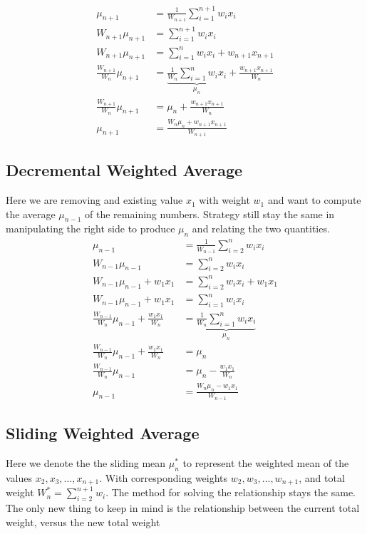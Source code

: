 \documentclass[english,12pt]{article}
\theoremstyle{plain}
\theoremstyle{definition}
\theoremstyle{definition} %
\begin{document}
\begin{align*}
\mu_{n+1} &= \frac{1}{W_{n+1}}\sum_{i=1}^{n+1} w_ix_i\\
W_{n+1}\mu_{n+1} &= \sum_{i=1}^{n+1} w_ix_i\\
W_{n+1}\mu_{n+1} &= \sum_{i=1}^{n} w_ix_i + w_{n+1}x_{n+1}\\
\frac{W_{n+1}}{W_n}\mu_{n+1} &= \underbrace{\frac{1}{W_n}\sum_{i=1}^{n} w_ix_i}_{\mu_n} + \frac{w_{n+1}x_{n+1}}{W_n}\\
\frac{W_{n+1}}{W_n}\mu_{n+1} &= \mu_n + \frac{w_{n+1}x_{n+1}}{W_n}\\
\mu_{n+1} &= \frac{W_n\mu_n + w_{n+1}x_{n+1}}{W_{n+1}}
\end{align*}

\subsection{Decremental Weighted Average}
Here we are removing and existing value $x_1$ with weight $w_1$ and want to compute the average $\mu_{n-1}$ of the remaining numbers.  Strategy still stay the same in manipulating the right side to produce $\mu_{n}$ and relating the two quantities.
\begin{align*}
\mu_{n-1} &= \frac{1}{W_{n-1}}\sum_{i=2}^nw_ix_i\\
W_{n-1}\mu_{n-1} &= \sum_{i=2}^nw_ix_i\\
W_{n-1}\mu_{n-1} + w_1x_1 &= \sum_{i=2}^nw_ix_i + w_1x_1\\
W_{n-1}\mu_{n-1} + w_1x_1 &= \sum_{i=1}^nw_ix_i\\
\frac{W_{n-1}}{W_n}\mu_{n-1} + \frac{w_1x_1}{W_n} &= \underbrace{\frac{1}{W_n}\sum_{i=1}^nw_ix_i}_{\mu_n}\\
\frac{W_{n-1}}{W_n}\mu_{n-1} + \frac{w_1x_1}{W_n} &= \mu_n\\
\frac{W_{n-1}}{W_n}\mu_{n-1}  &= \mu_n - \frac{w_1x_1}{W_n}\\
\mu_{n-1} &= \frac{W_n\mu_n - w_1x_1}{W_{n-1}}
\end{align*}

\subsection{Sliding Weighted Average}
Here we denote the the sliding mean $\mu_n^\ast$ to represent the weighted mean of the values $x_2,x_3,\ldots, x_{n+1}$.  With corresponding weights $w_2,w_3,\ldots, w_{n+1}$, and total weight $W_n^\ast = \sum_{i=2}^{n+1}w_i$.  The method for solving the relationship stays the same.  The only new thing to keep in mind is the relationship between the current total weight, versus the new total weight
\end{document}
